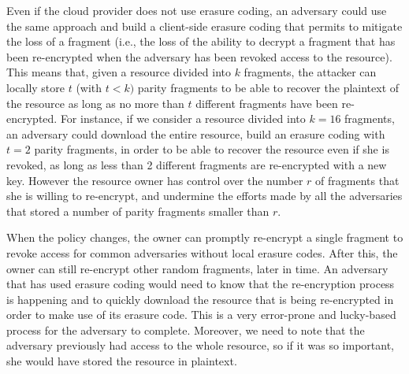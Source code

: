 Even if the cloud provider does not use erasure coding, an adversary could use the same approach and build a client-side erasure coding that permits to mitigate the loss of a fragment (i.e., the loss of the ability to decrypt a fragment that has been re-encrypted when the adversary has been revoked access to the resource). This means that, given a resource divided into $k$ fragments, the attacker can locally store $t$ (with $t < k)$ parity fragments to be able to recover the plaintext of the resource as long as no more than $t$ different fragments have been re-encrypted.
For instance, if we consider a resource divided into $k = 16$ fragments, an adversary could download the entire resource, build an erasure coding with $t = 2$ parity fragments, in order to be able to recover the resource even if she is revoked, as long as less than 2 different fragments are re-encrypted with a new key.
However the resource owner has control over the number $r$ of fragments that she is willing to re-encrypt, and undermine the efforts made by all the adversaries that stored a number of parity fragments smaller than $r$.

When the policy changes, the owner can promptly re-encrypt a single fragment to revoke access for common adversaries without local erasure codes. After this, the owner can still re-encrypt other random fragments, later in time. An adversary that has used erasure coding would need to know that the re-encryption process is happening and to quickly download the resource that is being re-encrypted in order to make use of its erasure code. This is a very error-prone and lucky-based process for the adversary to complete. Moreover, we need to note that the adversary previously had access to the whole resource, so if it was so important, she would have stored the resource in plaintext.
